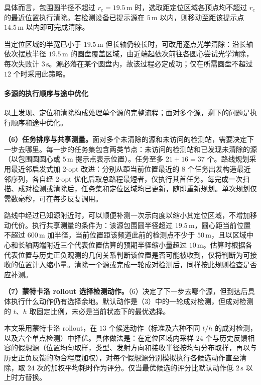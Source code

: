 具体而言，包围圆半径不超过 $r_c=19.5\,\mathrm{m}$ 时，选取距定位区域各顶点均不超过 $r_c$ 的最近位置执行清除。若检测设备已提示源在 $5\,\mathrm{m}$ 以内，则移动至距该提示点 $14.5\,\mathrm{m}$ 以内即可完成清除。

当定位区域的半宽已小于 $19.5\,\mathrm{m}$ 但长轴仍较长时，可改用逐点光学清除：沿长轴依次摆放半径 $19.5\,\mathrm{m}$ 的圆盘覆盖区域，由近端起依次前往各圆心尝试光学清除，每次失败计 $3\,\mathrm{s}$。源必落在某个圆盘内，故该过程必定成功；仅在所需圆盘不超过 $12$ 个时采用此策略。

\paragraph{多源的执行顺序与途中优化}

以上发现、定位和清除构成处理单个源的完整流程；面对多个源，剩下的问题是执行顺序和途中优化。

\textbf{（6）任务排序与共享测量。}面对多个未清除的源和未访问的检测站，需要决定下一步去哪里。每一步的任务集包含两类节点：未访问的检测站和已发现未清除的源（以包围圆圆心或 $5\,\mathrm{m}$ 提示点表示位置）。任务至多 $21+16=37$ 个。路线规划采用最近邻启发式加 2-opt 改进：分别从距当前位置最近的 $8$ 个任务出发构造最近邻序列，各自经 2-opt 优化后取总路程最短者，仅执行其首任务。每完成一次扫描、成对检测或清除后，任务集和定位区域均已更新，随即重新规划。单次规划仅需数毫秒，可在每步反复调用。

路线中经过已知源附近时，可以顺便补测一次示向度以缩小其定位区域，不增加移动代价。执行共享测量的条件为：该源包围圆半径超过 $19.5\,\mathrm{m}$，圆心距当前位置不超过 $600\,\mathrm{m}$ 加半径，当前位置距该频道此前的检测点不少于 $50\,\mathrm{m}$，且以区域中心和长轴两端附近三个代表位置估算的预期半径缩小量超过 $10\,\mathrm{m}$。估算时根据各代表位置与历史正负观测的几何关系判断该位置是否可能被收到，仅将判断为可接收的位置计入缩小量。清除一个源或完成一轮成对检测后，同样按此规则检查是否应补测。

\textbf{（7）蒙特卡洛 rollout 选择检测动作。}（6）决定了下一步去哪个源，但到达后具体执行什么动作仍有选择余地。默认动作是（3）中的一轮成对检测，但成对检测的 $t$、$h$ 取固定比例，未必是当前状态下的最优选择。

本文采用蒙特卡洛 rollout，在 $13$ 个候选动作（标准及六种不同 $t/h$ 的成对检测，以及六个单点检测）中择优。具体做法是：在定位区域内采样 $24$ 个与历史反馈相容的假想源（位置均匀取样，类型、发射方向和接收半径按均匀分布取样，再以与历史正负反馈的吻合程度加权），对每个假想源分别模拟执行各候选动作直至清除，取 $24$ 次的加权平均耗时作为评分。仅当最优候选的评分比默认动作低 $2\,\mathrm{s}$ 以上时方替换。

